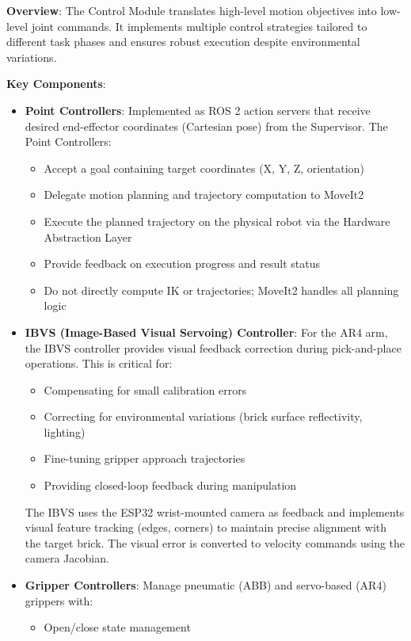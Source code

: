 \textbf{Overview}: The Control Module translates high-level motion objectives into low-level joint commands. It implements multiple control strategies tailored to different task phases and ensures robust execution despite environmental variations.

\textbf{Key Components}:

\begin{itemize}
    \item \textbf{Point Controllers}: Implemented as ROS 2 action servers that receive desired end-effector coordinates (Cartesian pose) from the Supervisor. The Point Controllers:
    \begin{itemize}
        \item Accept a goal containing target coordinates (X, Y, Z, orientation)
        \item Delegate motion planning and trajectory computation to MoveIt2
        \item Execute the planned trajectory on the physical robot via the Hardware Abstraction Layer
        \item Provide feedback on execution progress and result status
        \item Do not directly compute IK or trajectories; MoveIt2 handles all planning logic
    \end{itemize}
        
    \item \textbf{IBVS (Image-Based Visual Servoing) Controller}: For the AR4 arm, the IBVS controller provides visual feedback correction during pick-and-place operations. This is critical for:
    \begin{itemize}
        \item Compensating for small calibration errors
        \item Correcting for environmental variations (brick surface reflectivity, lighting)
        \item Fine-tuning gripper approach trajectories
        \item Providing closed-loop feedback during manipulation
    \end{itemize}
    
    The IBVS uses the ESP32 wrist-mounted camera as feedback and implements visual feature tracking (edges, corners) to maintain precise alignment with the target brick. The visual error is converted to velocity commands using the camera Jacobian.
    
    \item \textbf{Gripper Controllers}: Manage pneumatic (ABB) and servo-based (AR4) grippers with:
    \begin{itemize}
        \item Open/close state management
    \end{itemize}
\end{itemize}

